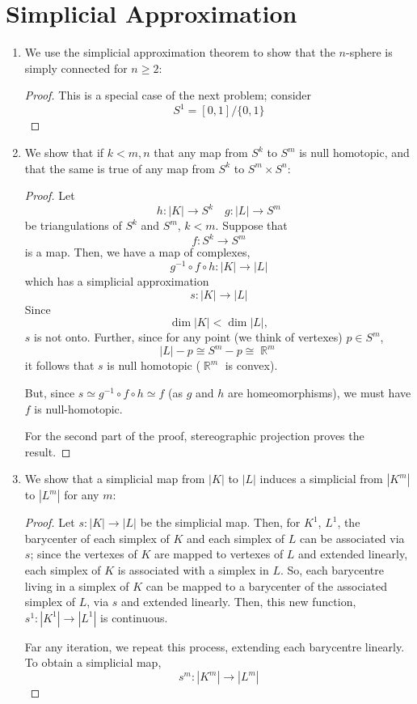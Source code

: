 \documentclass{book}
\DeclareMathOperator*{\R}{\mathbb{R}}
\begin{document}
\section{Simplicial Approximation}
\begin{enumerate}[(1)]
    \item We use the simplicial approximation theorem to show that the $n$-sphere is simply connected for $n \geq 2$: 
        \begin{proof} This is a special case of the next problem; consider 
            \[S^1 = [0,1]/\{0,1\}\] 
        \end{proof}

    \item We show that if $k < m,n$ that any map from $S^k$ to $S^m$ is null homotopic, and that the same is true of any map from $S^k$ to $S^m \times S^n$:   
        \begin{proof} Let 
            \[h: |K| \rightarrow S^k \quad g:|L| \rightarrow S^m\] be triangulations of $S^k$ and $S^m$, $k<m$. Suppose that 
            \[f: S^k \rightarrow S^m\] is a map. Then, we have a map of complexes, 
            \[g^{-1}\circ f \circ h : |K| \rightarrow |L|\]
            which has a simplicial approximation 
            \[s: |K| \rightarrow |L| \]
            Since 
            \[ \dim |K| < \dim |L|,\] $s$ is not onto. Further, since for any point (we think of vertexes) $p \in S^m$,
            \[|L| - p \cong S^m - p \cong \R^m\]  
            it follows that $s$ is null homotopic ($\R^m$ is convex). 
            \par But, since $s \simeq g^{-1}\circ f \circ h \simeq f$ (as $g$ and $h$ are homeomorphisms), we must have $f$ is null-homotopic. 
            \par For the second part of the proof, stereographic projection proves the result.
        \end{proof}

    \item We show that a simplicial map from $|K|$ to $|L|$ induces a simplicial from $|K^m|$ to $|L^m|$ for any $m$: 
        \begin{proof} Let $s: |K| \rightarrow |L|$ be the simplicial map. Then, for $K^1$, $L^1$, the barycenter of each simplex of $K$ and each simplex of $L$ can be associated via $s$; since the vertexes of $K$ are mapped to vertexes of $L$ and extended linearly, each simplex of $K$ is associated with a simplex in $L$. So, each barycentre living in a simplex of $K$ can be mapped to a barycenter of the associated simplex of $L$, via $s$ and extended linearly. Then, this new function, $s^1: |K^1| \rightarrow |L^1|$ is continuous. 
            \par Far any iteration, we repeat this process, extending each barycentre linearly. To obtain a simplicial map, 
            \[s^m: |K^m| \rightarrow |L^m|\]
        \end{proof}


\end{enumerate}
\end{document}
